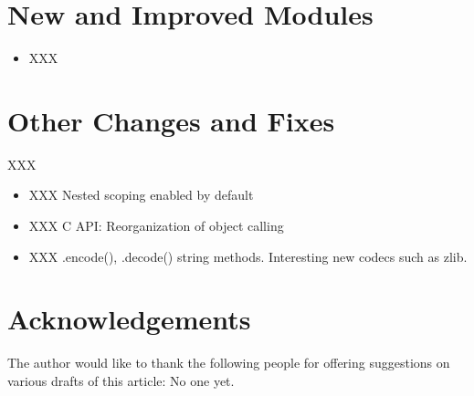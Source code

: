 \documentclass{howto}
\begin{document}
\section{New and Improved Modules}

\begin{itemize}

  \item XXX

\end{itemize}


\section{Other Changes and Fixes}

XXX

\begin{itemize}

  \item XXX Nested scoping enabled by default

  \item XXX C API: Reorganization of object calling 

  \item XXX .encode(), .decode() string methods.  Interesting new codecs such
as zlib.

 
 
 

\end{itemize}



\section{Acknowledgements}

The author would like to thank the following people for offering
suggestions on various drafts of this article: No one yet.
\end{document}
